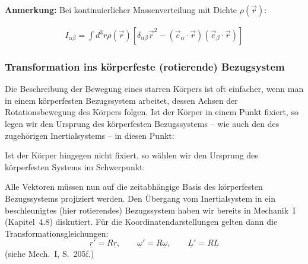 \documentclass[10pt, letterpaper]{article}
\begin{document}
\textbf{Anmerkung:} Bei kontinuierlicher Massenverteilung mit Dichte $\rho(\vec{r})$:

$$
\begin{aligned}
I_{\alpha\beta} = \int d^3r \rho(\vec{r}) \left[\delta_{\alpha\beta} \vec{r}^2 - (\vec{e}_\alpha \cdot \vec{r})(\vec{e}_\beta \cdot \vec{r})\right]
\end{aligned}
$$


\subsubsection{Transformation ins körperfeste (rotierende) Bezugsystem}

Die Beschreibung der Bewegung eines starren Körpers ist oft einfacher, wenn man in einem körperfesten Bezugssystem arbeitet, dessen Achsen der Rotationsbewegung des Körpers folgen. Ist der Körper in einem Punkt fixiert, so legen wir den Ursprung des körperfesten Bezugssystems – wie auch den des zugehörigen Inertialsystems – in diesen Punkt:

\begin{center}
\end{center}

Ist der Körper hingegen nicht fixiert, so wählen wir den Ursprung des körperfesten Systems im Schwerpunkt:

\begin{center}
\end{center}

Alle Vektoren müssen nun auf die zeitabhängige Basis des körperfesten Bezugssystems projiziert werden. Den Übergang vom Inertialsystem in ein beschleunigtes (hier rotierendes) Bezugssystem haben wir bereits in Mechanik~I (Kapitel~4.8) diskutiert. Für die Koordinatendarstellungen gelten dann die Transformationsgleichungen:
\[
\underline{r}' = R \underline{r}, \qquad
\underline{\omega}' = R \underline{\omega}, \qquad
\underline{L}' = R \underline{L}
\]
(siehe Mech.~I, S.~205f.)
\end{document}
